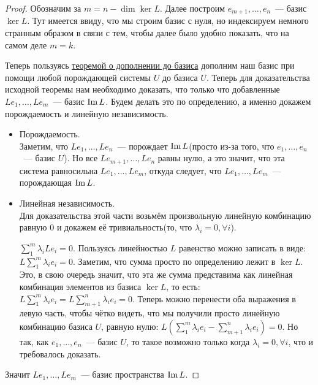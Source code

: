 \begin{proof}
    Обозначим за $m=n - \dim \ker L$.
    Далее построим $e_{m+1},\dots, e_n$~--- базис $\ker L$.
    Тут имеется ввиду, что мы строим базис с нуля, но индексируем немного странным
    образом в связи с тем, чтобы далее было удобно показать, что на самом деле $m = k$.

    Теперь пользуясь \hyperref[thm:О дополнении до базиса]{теоремой о дополнении до базиса}
    дополним наш базис
    при помощи любой порождающей системы $U$ до базиса $U$. Теперь для доказательства
    исходной теоремы нам необходимо доказать, что только что добавленные $L e_1,\dots, L e_m$~--- базис $\operatorname{Im} L$.
    Будем делать это по определению, а именно докажем порождаемость и линейную независимость.

    \begin{itemize}
        \item Порождаемость.\\
            Заметим, что $Le_1,\dots,Le_n$~--- порождает $\operatorname{Im} L$(просто из-за того, что $e_1,\dots,e_n$~--- базис $U$).
            Но все $Le_{m+1}, \dots, Le_n$ равны нулю, а это значит, что эта система равносильна
            $Le_1,\dots,Le_m$, откуда следует, что $Le_1,\dots, Le_m$~--- порождающая $\operatorname{Im} L$.
        \item Линейная независимость.\\
            Для доказательства этой части возьмём произвольную линейную комбинацию равную 0 и докажем её 
            тривиальность(то, что $\lambda_i = 0, \forall i$).

            $\sum\limits_{1}^{m}{\lambda_i Le_i} = 0$. Пользуясь линейностью $L$ равенство можно записать
            в виде: $L\sum\limits_{1}^{m}{\lambda_ie_i} = 0$. Заметим, что сумма просто по определению
            лежит в $\ker L$. Это, в свою очередь значит, что эта же сумма представима как линейная
            комбинация элементов из базиса $\ker L$, то есть:  
            $L\sum\limits_{1}^{m}{\lambda_ie_i} = L\sum\limits_{m+1}^{n}{\lambda_ie_i} = 0$. 
            Теперь можно перенести оба выражения в левую часть, чтобы чётко видеть, что мы получили
            просто линейную комбинацию базиса $U$, равную нулю: 
            $L\left(\sum\limits_{1}^{m}{\lambda_ie_i} - \sum\limits_{m+1}^{n}{\lambda_ie_i}\right) = 0$. 
            Но так, как $e_1,\dots, e_n$~--- базис $U$, то такое возможно только когда
            $\lambda_i = 0, \forall i$, что и требовалось доказать.
    \end{itemize}
    Значит $Le_1,\dots,Le_m$~--- базис пространства $\operatorname{Im} L$.
\end{proof}
